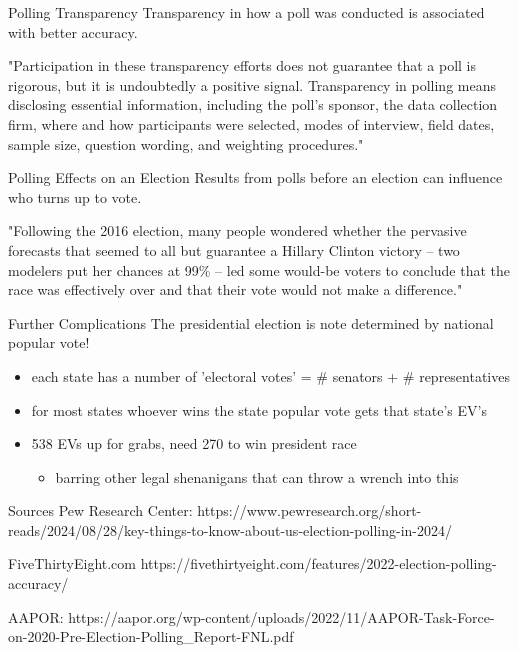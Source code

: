 \documentclass{beamer}
\begin{document}
\begin{frame}{Polling Transparency}
Transparency in how a poll was conducted is associated with better accuracy. \vspace{6mm}

"Participation in these transparency efforts does not guarantee that a poll is rigorous, but it is undoubtedly a positive signal. Transparency in polling means disclosing essential information, including the poll’s sponsor, the data collection firm, where and how participants were selected, modes of interview, field dates, sample size, question wording, and weighting procedures."
\end{frame}

\begin{frame}{Polling Effects on an Election}
Results from polls before an election can influence who turns up to vote. \vspace{8mm}

"Following the 2016 election, many people wondered whether the pervasive forecasts that seemed to all but guarantee a Hillary Clinton victory – two modelers put her chances at 99\% – led some would-be voters to conclude that the race was effectively over and that their vote would not make a difference."
\end{frame}

\begin{frame}{Further Complications}
The presidential election is note determined by national popular vote!
\begin{itemize}
    \item each state has a number of 'electoral votes' = \# senators + \# representatives
    \item for most states whoever wins the state popular vote gets that state's EV's
    \item 538 EVs up for grabs, need 270 to win president race
    \begin{itemize}
        \item barring other legal shenanigans that can throw a wrench into this
    \end{itemize}
\end{itemize}
\end{frame}

\begin{frame}{Sources}
Pew Research Center:
https://www.pewresearch.org/short-reads/2024/08/28/key-things-to-know-about-us-election-polling-in-2024/ \vspace{2mm}

FiveThirtyEight.com
https://fivethirtyeight.com/features/2022-election-polling-accuracy/
\vspace{2mm}

AAPOR:
https://aapor.org/wp-content/uploads/2022/11/AAPOR-Task-Force-on-2020-Pre-Election-Polling\_Report-FNL.pdf
\end{frame}
\end{document}
